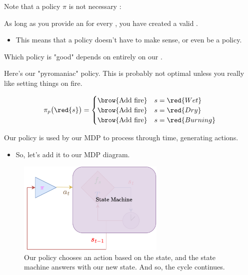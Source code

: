         Note that a policy $\pi$ is not necessary :\\

        \begin{clarification}
            As long as you provide an  for every , you have created a valid .

            \begin{itemize}
                \item This means that a policy doesn't have to make sense, or even be a  policy.
            \end{itemize}

            Which policy is "good" depends on entirely on our .
        \end{clarification}

        \miniex Here's our "pyromaniac" policy. This is probably not optimal unless you really like setting things on fire.

        \begin{equation}
            \pi_p \big(\red{s} \big) =
            \begin{cases}
                \text{\brow{Add fire}} & s = \red{Wet} \\
                \text{\brow{Add fire}} & s = \red{Dry} \\
                \text{\brow{Add fire}} & s = \red{Burning}
            \end{cases}
        \end{equation}

        \subsecdiv

        Our policy is used by our MDP to process through time, generating actions.

        \begin{itemize}
            \item So, let's add it to our MDP diagram.
        \end{itemize}

        \begin{figure}[H]
            \centering
            \includegraphics[width=70mm,scale=0.5]{images/mdp_images/policy_statemachine.png}
            
            \caption*{Our policy chooses an action based on the state, and the state machine answers with our new state. And so, the cycle continues.}
        \end{figure}
        

